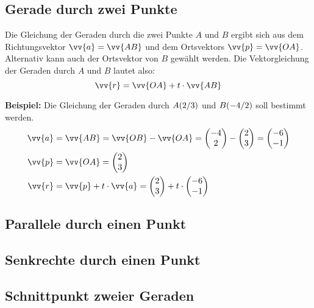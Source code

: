 \newpage
\subsection{Gerade durch zwei Punkte}

Die Gleichung der Geraden durch die zwei Punkte $A$ und $B$ ergibt sich aus dem
Richtungsvektor $\vv{a} = \vv{AB}$ und dem Ortsvektors $\vv{p} = \vv{OA}$.
Alternativ kann auch der Ortsvektor von $B$ gewählt werden. Die Vektorgleichung
der Geraden durch $A$ und $B$ lautet also:
\[
  \vv{r} = \vv{OA}+t\cdot\vv{AB}
\]
\begin{example}
  \textbf{Beispiel:} Die Gleichung der Geraden durch $\pxy[A]{2,3}$ und
  $\pxy[B]{-4,2}$ soll bestimmt werden.
  \begin{align*}
    \vv{a} &= \vv{AB} = \vv{OB}-\vv{OA} = \vxy{-4,2}-\vxy{2,3} = \vxy{-6,-1} \\
    \vv{p} &= \vv{OA} = \vxy{2,3} \\
    \vv{r} &= \vv{p}+t\cdot \vv{a} = \vxy{2,3}+t\cdot \vxy{-6,-1}
  \end{align*}
\end{example}
\subsection{Parallele durch einen Punkt}


\subsection{Senkrechte durch einen Punkt}

\subsection{Schnittpunkt zweier Geraden}
